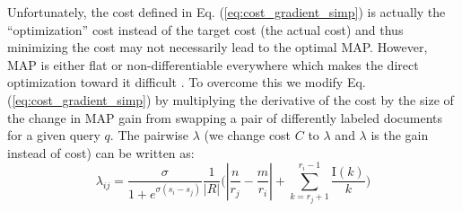 Unfortunately, the cost defined in Eq. (\ref{eq:cost_gradient_simp}) 
is actually the ``optimization'' cost instead of the target cost 
(the actual cost) \cite{export:68133} and thus minimizing the cost 
may not necessarily lead to the optimal MAP.
However, MAP is either flat or non-differentiable everywhere which 
makes the direct optimization toward it difficult \cite{Yue:2007:SVM:1277741.1277790}. 
To overcome this we modify Eq. (\ref{eq:cost_gradient_simp})
by multiplying the derivative of the cost by the size of 
the change in MAP gain from swapping a pair of differently labeled 
documents for a given query $q$. The pairwise $\lambda$ (we change 
cost $C$ to $\lambda$ and $\lambda$ is the gain instead of cost)
can be written as:
\begin{equation}
\label{eq:pairwise_lambda_map_simp}
\lambda_{ij} = \frac{\sigma}{1+e^{\sigma(s_i-s_j)}}\frac{1}{|R|}\bigg( \left | \frac{n}{r_j} - \frac{m}{r_i} \right | + \sum_{k=r_j+1}^{r_i-1}{\frac{\mathrm{I}(k)}{k}} \bigg)
\end{equation}
